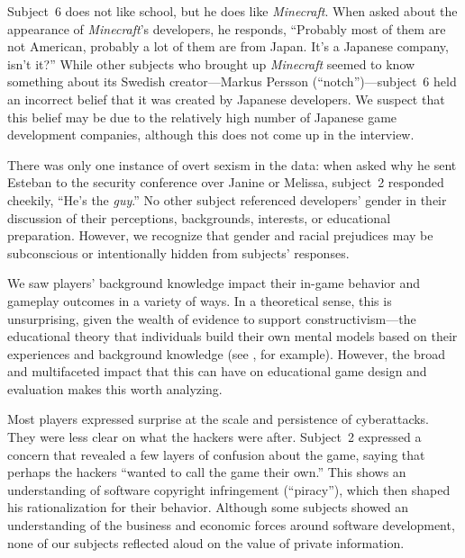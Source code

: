 \documentclass[letterpaper]{article}
\begin{document}
Subject~6 does not like school, but he does
like \textit{Minecraft}. When asked about the appearance of \textit{Minecraft}'s
developers, he responds, ``Probably most of them are not American,
probably a lot of them are from Japan. It's a Japanese company, isn't it?''
While other subjects who brought up \textit{Minecraft} seemed to know something
about its Swedish creator---Markus Persson (``notch'')---subject~6 held
an incorrect belief that it was created by Japanese developers. 
We suspect that this belief may be due to the relatively high number
of Japanese game development companies, although 
this does not come up in the interview.

There was only one instance of overt sexism in the data:
when asked why he sent Esteban to the security conference over
Janine or Melissa, subject~2 responded cheekily, ``He's the \textit{guy}.''
No other subject referenced developers' gender in their discussion
of their perceptions, backgrounds, interests, or educational preparation.
However, we recognize that gender and racial prejudices may be
subconscious or intentionally hidden from subjects' responses.




We saw players' background knowledge impact their in-game behavior
and gameplay outcomes in a variety of ways.
In a theoretical sense, this is unsurprising, given the wealth of
evidence to support constructivism---the educational theory that
individuals build their own mental models based on their experiences
and background knowledge (see \citet{Duffy1996}, for example).
However, the broad and multifaceted impact that this can have on
educational game design and evaluation makes this worth analyzing.

Most players expressed surprise at the scale and persistence
of cyberattacks. They were less clear on what the hackers
were after. Subject~2 expressed a concern that revealed a few
layers of confusion about the game, saying that perhaps the
hackers ``wanted to call the game their own.''
This shows an understanding of software copyright infringement (``piracy''),
which then shaped his rationalization for their behavior.
Although some subjects showed an understanding of the business and
economic forces around software development, none of our subjects
reflected aloud on the value of private information.
\end{document}
